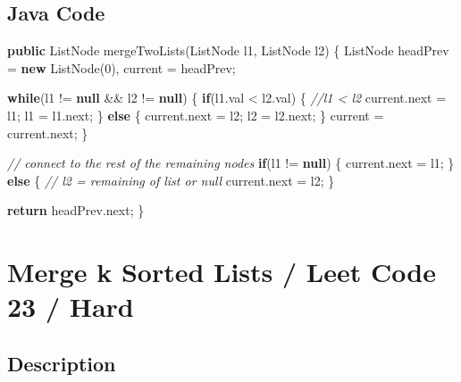 \documentclass[]{book}
\newenvironment{Shaded}{\begin{snugshade}}{\end{snugshade}}
\newcommand{\CommentTok}[1]{\textcolor[rgb]{0.56,0.35,0.01}{\textit{#1}}}
\newcommand{\DecValTok}[1]{\textcolor[rgb]{0.00,0.00,0.81}{#1}}
\newcommand{\FunctionTok}[1]{\textcolor[rgb]{0.00,0.00,0.00}{#1}}
\newcommand{\KeywordTok}[1]{\textcolor[rgb]{0.13,0.29,0.53}{\textbf{#1}}}
\newcommand{\NormalTok}[1]{#1}
\begin{document}
\hypertarget{java-code-72}{%
\subsection{Java Code}\label{java-code-72}}

\begin{Shaded}
\begin{Highlighting}[]
\KeywordTok{public}\NormalTok{ ListNode }\FunctionTok{mergeTwoLists}\NormalTok{(ListNode l1, ListNode l2) \{}
\NormalTok{    ListNode headPrev = }\KeywordTok{new} \FunctionTok{ListNode}\NormalTok{(}\DecValTok{0}\NormalTok{), current = headPrev;}

    \KeywordTok{while}\NormalTok{(l1 != }\KeywordTok{null}\NormalTok{ && l2 != }\KeywordTok{null}\NormalTok{) \{}
        \KeywordTok{if}\NormalTok{(l1.}\FunctionTok{val}\NormalTok{ < l2.}\FunctionTok{val}\NormalTok{) \{}
            \CommentTok{//l1 < l2}
\NormalTok{            current.}\FunctionTok{next}\NormalTok{ = l1;}
\NormalTok{            l1 = l1.}\FunctionTok{next}\NormalTok{;}
\NormalTok{        \} }\KeywordTok{else}\NormalTok{ \{}
\NormalTok{            current.}\FunctionTok{next}\NormalTok{ = l2;}
\NormalTok{            l2 = l2.}\FunctionTok{next}\NormalTok{;}
\NormalTok{        \}}
\NormalTok{        current = current.}\FunctionTok{next}\NormalTok{;}
\NormalTok{    \}}

    \CommentTok{// connect to the rest of the remaining nodes}
    \KeywordTok{if}\NormalTok{(l1 != }\KeywordTok{null}\NormalTok{) \{}
\NormalTok{        current.}\FunctionTok{next}\NormalTok{ = l1;}
\NormalTok{    \} }\KeywordTok{else}\NormalTok{ \{}
        \CommentTok{// l2 = remaining of list or null}
\NormalTok{        current.}\FunctionTok{next}\NormalTok{ = l2;}
\NormalTok{    \}}

    \KeywordTok{return}\NormalTok{ headPrev.}\FunctionTok{next}\NormalTok{;}
\NormalTok{\}}
\end{Highlighting}
\end{Shaded}

\hypertarget{merge-k-sorted-lists-leet-code-23-hard}{%
\section{Merge k Sorted Lists / Leet Code 23 / Hard}\label{merge-k-sorted-lists-leet-code-23-hard}}

\hypertarget{description-94}{%
\subsection{Description}\label{description-94}}
\end{document}
